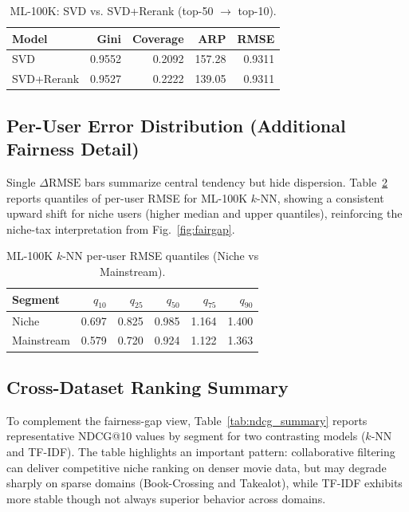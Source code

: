 \documentclass[conference]{IEEEtran}
\begin{document}
\begin{table}[!t]
  \centering
  \caption{ML-100K: SVD vs. SVD+Rerank (top-50 $\rightarrow$ top-10).}
  \label{tab:rerank_additional}
  \begin{tabular}{@{}lrrrr@{}}
    \toprule
    \textbf{Model} & \textbf{Gini} & \textbf{Coverage} & \textbf{ARP} & \textbf{RMSE} \\
    \midrule
    SVD & 0.9552 & 0.2092 & 157.28 & 0.9311 \\
    SVD+Rerank & 0.9527 & 0.2222 & 139.05 & 0.9311 \\
    \bottomrule
  \end{tabular}
\end{table}

\subsection{Per-User Error Distribution (Additional Fairness Detail)}

Single $\Delta\mathrm{RMSE}$ bars summarize central tendency but hide dispersion. Table~\ref{tab:rmse_quantiles} reports quantiles of per-user RMSE for ML-100K $k$-NN, showing a consistent upward shift for niche users (higher median and upper quantiles), reinforcing the niche-tax interpretation from Fig.~\ref{fig:fairgap}.

\begin{table}[!t]
  \centering
  \caption{ML-100K $k$-NN per-user RMSE quantiles (Niche vs Mainstream).}
  \label{tab:rmse_quantiles}
  \begin{tabular}{@{}lrrrrr@{}}
    \toprule
    \textbf{Segment} & $q_{10}$ & $q_{25}$ & $q_{50}$ & $q_{75}$ & $q_{90}$ \\
    \midrule
    Niche & 0.697 & 0.825 & 0.985 & 1.164 & 1.400 \\
    Mainstream & 0.579 & 0.720 & 0.924 & 1.122 & 1.363 \\
    \bottomrule
  \end{tabular}
\end{table}

\subsection{Cross-Dataset Ranking Summary}

To complement the fairness-gap view, Table~\ref{tab:ndcg_summary} reports representative NDCG@10 values by segment for two contrasting models ($k$-NN and TF-IDF). The table highlights an important pattern: collaborative filtering can deliver competitive niche ranking on denser movie data, but may degrade sharply on sparse domains (Book-Crossing and Takealot), while TF-IDF exhibits more stable though not always superior behavior across domains.
\end{document}
